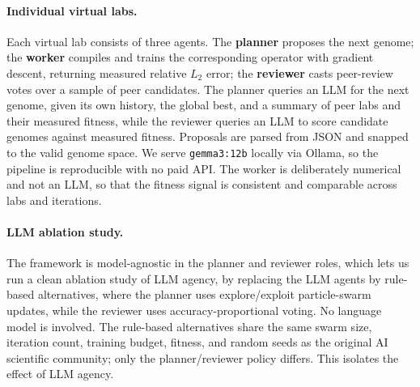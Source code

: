 \documentclass{article}
\begin{document}
\paragraph{Individual virtual labs.}
Each virtual lab consists of three agents. The \textbf{planner} proposes the next genome; the \textbf{worker} compiles and trains the corresponding operator with gradient descent, returning measured relative $L_2$ error; the \textbf{reviewer} casts peer-review votes over a sample of peer candidates. The planner queries an LLM for the next genome, given its own history, the global best, and a summary of peer labs and their measured fitness, while the reviewer queries an LLM to score candidate genomes against measured fitness. Proposals are parsed from JSON and snapped to the valid genome space. We serve \texttt{gemma3:12b} locally via Ollama, so the pipeline is reproducible with no paid API. The worker is deliberately numerical and not an LLM, so that the fitness signal is consistent and comparable across labs and iterations. 

\paragraph{LLM ablation study.}
The framework is model-agnostic in the planner and reviewer roles, which lets us run a clean ablation study of LLM agency, by replacing the LLM agents by rule-based alternatives, where the planner uses explore/exploit particle-swarm updates, while the reviewer uses accuracy-proportional voting. No language model is involved. The rule-based alternatives share the same swarm size, iteration count, training budget, fitness, and random seeds as the original AI scientific community; only the planner/reviewer policy differs. This isolates the effect of LLM agency.
\end{document}
